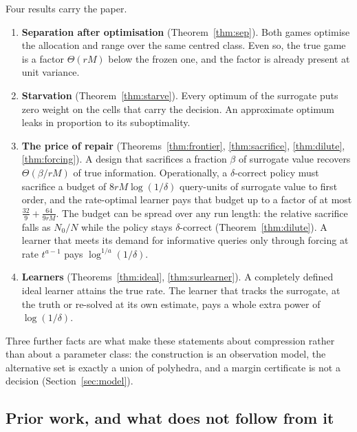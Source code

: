 Four results carry the paper.
\begin{enumerate}
\item[1)] \textbf{Separation after optimisation} (Theorem~\ref{thm:sep}). Both games optimise
the allocation and range over the same centred class. Even so, the true game is a factor
$\Theta(rM)$ below the frozen one, and the factor is already present at unit variance.
\item[2)] \textbf{Starvation} (Theorem~\ref{thm:starve}). Every optimum of the surrogate puts
zero weight on the cells that carry the decision. An approximate optimum leaks in proportion
to its suboptimality.
\item[3)] \textbf{The price of repair} (Theorems~\ref{thm:frontier}, \ref{thm:sacrifice},
\ref{thm:dilute}, \ref{thm:forcing}). A design that sacrifices a fraction $\beta$ of surrogate value recovers
$\Theta(\beta/rM)$ of true information. Operationally, a $\delta$-correct policy must sacrifice
a budget of $8rM\log(1/\delta)$ query-units of surrogate value to first order, and the
rate-optimal learner pays that budget up to a factor of at most $\frac{32}{9}+\frac{64}{9rM}$.
The budget can be spread over any run length: the relative sacrifice falls as $N_{0}/N$ while
the policy stays $\delta$-correct (Theorem~\ref{thm:dilute}).
A learner that meets its demand for informative queries only through forcing at rate
$t^{a-1}$ pays $\log^{1/a}(1/\delta)$.
\item[4)] \textbf{Learners} (Theorems~\ref{thm:ideal}, \ref{thm:surlearner}). A completely
defined ideal learner attains the true rate. The learner that tracks the surrogate, at the
truth or re-solved at its own estimate, pays a whole extra power of $\log(1/\delta)$.
\end{enumerate}
Three further facts are what make these statements about compression rather than about a
parameter class: the construction is an observation model, the alternative set is exactly a
union of polyhedra, and a margin certificate is not a decision (Section~\ref{sec:model}).

\subsection{Prior work, and what does not follow from it}

